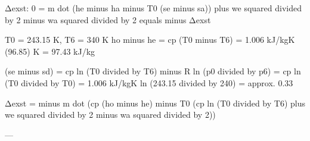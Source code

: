 Δexst:  
0 = m dot (he minus ha minus T0 (se minus sa)) plus we squared divided by 2 minus wa squared divided by 2 equals minus Δexst  

T0 = 243.15 K, T6 = 340 K  
ho minus he = cp (T0 minus T6) = 1.006 kJ/kgK (96.85) K = 97.43 kJ/kg  

(se minus sd) = cp ln (T0 divided by T6) minus R ln (p0 divided by p6)  
= cp ln (T0 divided by T0) = 1.006 kJ/kgK ln (243.15 divided by 240) = approx. 0.33  

Δexst = minus m dot (cp (ho minus he) minus T0 (cp ln (T0 divided by T6) plus we squared divided by 2 minus wa squared divided by 2))  

---